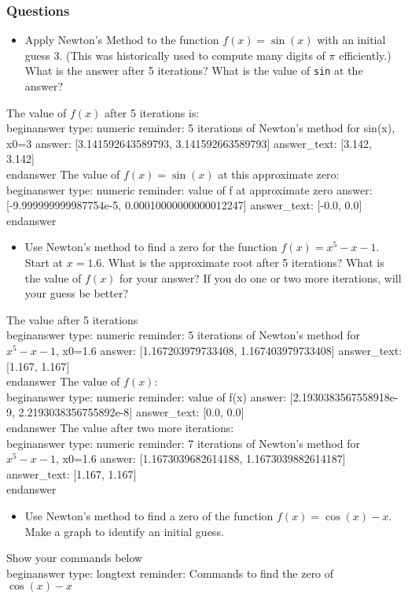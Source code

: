 \documentclass[12pt]{article}
\begin{document}
\subsubsection{Questions}\begin{itemize}\item Apply Newton's Method to the function $f(x) = \sin(x)$ with an   initial guess $3$. (This was historically used to compute many   digits of $\pi$ efficiently.) What is the answer after 5 iterations?   What is the value of \texttt{sin} at the answer?\end{itemize}\newline
The value of $f(x)$ after 5 iterations is:
\\begin{answer}
    type: numeric
    reminder: 5 iterations of Newton's method for sin(x), x0=3
    answer: [3.141592643589793, 3.141592663589793]
    answer_text: [3.142, 3.142] 
\\end{answer}
\newline
The value of $f(x)=\sin(x)$ at this approximate zero:
\\begin{answer}
    type: numeric
    reminder: value of f at approximate zero
    answer: [-9.999999999987754e-5, 0.00010000000000012247]
    answer_text: [-0.0, 0.0] 
\\end{answer}
\begin{itemize}\item Use Newton's method to find a zero for the function   $f(x)=x^5-x-1$. Start at $x=1.6$. What is the approximate root after   5 iterations? What is the value of $f(x)$ for your answer? If you do   one or two more iterations, will your guess be better?\end{itemize}\newline
The value after 5 iterations
\\begin{answer}
    type: numeric
    reminder: 5 iterations of Newton's method for \( x^5 -x - 1 \), x0=1.6
    answer: [1.167203979733408, 1.167403979733408]
    answer_text: [1.167, 1.167] 
\\end{answer}
\newline
The value of $f(x)$:
\\begin{answer}
    type: numeric
    reminder: value of f(x)
    answer: [2.1930383567558918e-9, 2.2193038356755892e-8]
    answer_text: [0.0, 0.0] 
\\end{answer}
\newline
The value after two more iterations:
\\begin{answer}
    type: numeric
    reminder: 7 iterations of Newton's method for \( x^5 -x - 1 \), x0=1.6
    answer: [1.1673039682614188, 1.1673039882614187]
    answer_text: [1.167, 1.167] 
\\end{answer}
\begin{itemize}\item Use Newton's method to find a zero of the function $f(x) = \cos(x) -   x$. Make a graph to identify an initial guess.\end{itemize}\newline
Show your commands below
\\begin{answer}
type: longtext
reminder: Commands to find the zero of \( \cos(x) -x \)
\end{document}
